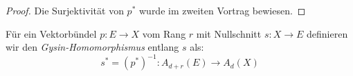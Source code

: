\documentclass[10pt,a4paper]{article}
\begin{document}
\begin{proof}
Die Surjektivität von $p^\ast$ wurde im zweiten Vortrag bewiesen.
\end{proof}

\begin{definition}
Für ein Vektorbündel $p:E\to X$ vom Rang $r$ mit Nullschnitt $s:X\to E$ definieren wir den \textit{Gysin-Homomorphismus} entlang $s$ als:
\[ s^\ast = (p^\ast)^{-1}: A_{d+r}(E)\to A_d(X) \]
\end{definition}
\end{document}
